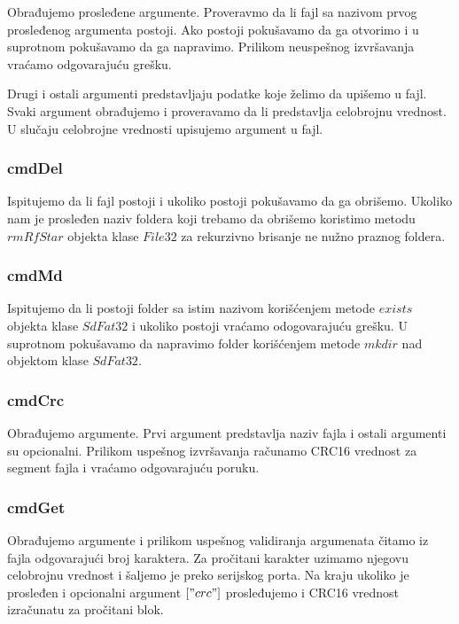 \documentclass[a4paper]{extarticle}
\begin{document}
	Obrađujemo prosleđene argumente. Proveravmo da li fajl sa nazivom prvog prosleđenog argumenta postoji. Ako postoji pokušavamo da ga otvorimo i u suprotnom pokušavamo da ga napravimo. Prilikom neuspešnog izvršavanja vraćamo odgovarajuću grešku.
	
	Drugi  i ostali argumenti predstavljaju podatke koje želimo da upišemo u fajl. Svaki argument obrađujemo i proveravamo da li predstavlja celobrojnu vrednost. U slučaju celobrojne vrednosti upisujemo argument u fajl. 
	
	\subsubsection{cmdDel}
	
	Ispitujemo da li fajl postoji i ukoliko postoji pokušavamo da ga obrišemo. Ukoliko nam je prosleđen naziv foldera koji trebamo da obrišemo koristimo metodu $rmRfStar$ objekta klase $File32$ za rekurzivno brisanje ne nužno praznog foldera.
	
	\subsubsection{cmdMd}
	
	Ispitujemo da li postoji folder sa istim nazivom korišćenjem metode $exists$ objekta klase $SdFat32$ i ukoliko postoji vraćamo odogovarajuću grešku. U suprotnom pokušavamo da napravimo folder korišćenjem metode $mkdir$ nad objektom klase $SdFat32$.
	
	
	\subsubsection{cmdCrc}
	
	Obrađujemo argumente. Prvi argument predstavlja naziv fajla i ostali argumenti su opcionalni. Prilikom uspešnog izvršavanja računamo CRC16 vrednost za  segment fajla i vraćamo odgovarajuću poruku.
	
	\subsubsection{cmdGet}
	
	Obrađujemo argumente i prilikom uspešnog validiranja argumenata čitamo iz fajla  odgovarajući broj karaktera. Za pročitani karakter uzimamo njegovu celobrojnu vrednost i šaljemo je preko serijskog porta. Na kraju ukoliko je prosleđen i opcionalni argument $["crc"]$ prosleđujemo i CRC16 vrednost izračunatu za pročitani blok.
	
\end{document}

